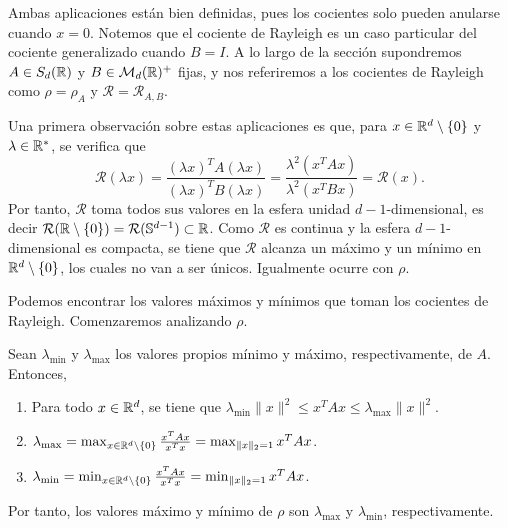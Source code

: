 Ambas aplicaciones están bien definidas, pues los cocientes solo pueden anularse cuando $x = 0$. Notemos que el cociente de Rayleigh es un caso particular del cociente generalizado cuando $B = I$. A lo largo de la sección supondremos $A \in S_d(\mathbb{R})$ y $B \in \mathcal{M}_d(\mathbb{R})^+$ fijas, y nos referiremos a los cocientes de Rayleigh como $\rho = \rho_A$ y $\mathcal{R} = \mathcal{R}_{A,B}$.

Una primera observación sobre estas aplicaciones es que, para $x \in \mathbb{R}^d \setminus \{0\}$ y $\lambda \in \mathbb{R}^*$, se verifica que
\[ \mathcal{R}(\lambda x) = \frac{(\lambda x)^TA(\lambda x)}{(\lambda x)^TB(\lambda x)} = \frac{\lambda^2(x^TAx)}{\lambda^2(x^TBx)} = \mathcal{R}(x). \]
Por tanto, $\mathcal{R}$ toma todos sus valores en la esfera unidad $d-1$-dimensional, es decir $\mathcal{R}(\mathbb{R} \setminus \{0\}) = \mathcal{R}(\mathbb{S}^{d-1}) \subset \mathbb{R}$. Como $\mathcal{R}$ es continua y la esfera $d-1$-dimensional es compacta, se tiene que $\mathcal{R}$ alcanza un máximo y un mínimo en $\mathbb{R}^d \setminus \{0\}$, los cuales no van a ser únicos. Igualmente ocurre con $\rho$.

Podemos encontrar los valores máximos y mínimos que toman los cocientes de Rayleigh. Comenzaremos analizando $\rho$.


\begin{thm}
    Sean $\lambda_{\min}$ y $\lambda_{\max}$ los valores propios mínimo y máximo, respectivamente, de $A$. Entonces,
    \begin{enumerate}
        \item Para todo $x \in \mathbb{R}^d$, se tiene que $\lambda_{\min} \|x\|^2 \le x^TAx \le \lambda_{\max}\|x\|^2$.
        \item $\lambda_{\max} = \max_{x \in \mathbb{R}^d \setminus \{0\}} \frac{x^TAx}{x^Tx} = \max_{\|x\|_2 = 1} x^TAx$.
        \item $\lambda_{\min} = \min_{x \in \mathbb{R}^d \setminus \{0\}} \frac{x^TAx}{x^Tx} = \min_{\|x\|_2 = 1} x^TAx$.
    \end{enumerate}
    Por tanto, los valores máximo y mínimo de $\rho$ son $\lambda_{\max}$ y $\lambda_{\min}$, respectivamente.
\end{thm}

